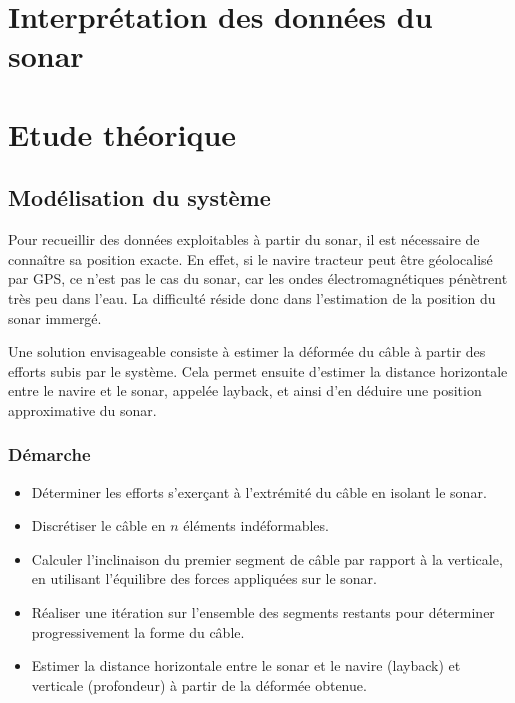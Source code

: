 \documentclass[12pt,a4paper]{report}
\begin{document}
\chapter{Interprétation des données du sonar}


\chapter{Etude théorique}


\section{Modélisation du système}

Pour recueillir des données exploitables à partir du sonar, il est nécessaire de connaître sa position exacte.
En effet, si le navire tracteur peut être géolocalisé par GPS, ce n’est pas le cas du sonar, car les ondes électromagnétiques pénètrent très peu dans l’eau.
La difficulté réside donc dans l’estimation de la position du sonar immergé.

Une solution envisageable consiste à estimer la déformée du câble à partir des efforts subis par le système.
Cela permet ensuite d’estimer la distance horizontale entre le navire et le sonar, appelée layback, et ainsi d’en déduire une position approximative du sonar.

\subsection{Démarche}

\begin{itemize}


  \item Déterminer les efforts s'exerçant à l'extrémité du câble en isolant le sonar.
  \item Discrétiser le câble en $n$ éléments indéformables.
  \item Calculer l'inclinaison du premier segment de câble par rapport à la verticale, en utilisant l'équilibre des forces appliquées sur le sonar.
  \item Réaliser une itération sur l’ensemble des segments restants pour déterminer progressivement la forme du câble.
  \item Estimer la distance horizontale entre le sonar et le navire (layback) et verticale (profondeur) à partir de la déformée obtenue.

\end{itemize}
\end{document}
